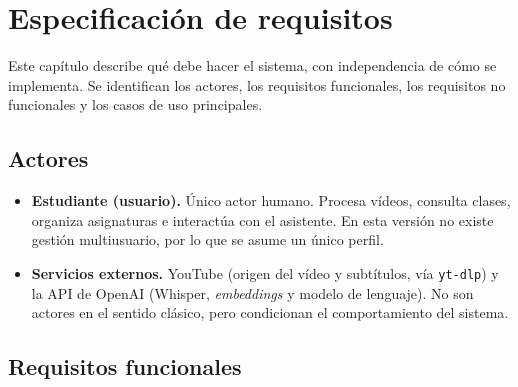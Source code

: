 \chapter{Especificación de requisitos}
\label{cap:requisitos}

Este capítulo describe qué debe hacer el sistema, con independencia de cómo se implementa.
Se identifican los actores, los requisitos funcionales, los requisitos no funcionales y los
casos de uso principales.

\section{Actores}

\begin{itemize}
  \item \textbf{Estudiante (usuario).} Único actor humano. Procesa vídeos, consulta clases,
        organiza asignaturas e interactúa con el asistente. En esta versión no existe gestión
        multiusuario, por lo que se asume un único perfil.
  \item \textbf{Servicios externos.} YouTube (origen del vídeo y subtítulos, vía \texttt{yt-dlp})
        y la API de OpenAI (Whisper, \textit{embeddings} y modelo de lenguaje). No son actores en
        el sentido clásico, pero condicionan el comportamiento del sistema.
\end{itemize}

\section{Requisitos funcionales}

